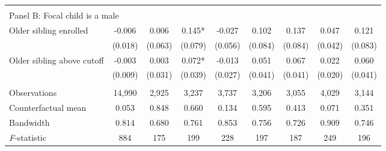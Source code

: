 {{\begin{tabular}{lcccccccc}
&  &  &  & & & & & \\
\multicolumn{10}{l}{Panel B: Focal child is a male} \\
Older sibling enrolled&      -0.006   &       0.006   &       0.145*  &      -0.027   &       0.102   &       0.137   &       0.047   &       0.121   \\
                    &     (0.018)   &     (0.063)   &     (0.079)   &     (0.056)   &     (0.084)   &     (0.084)   &     (0.042)   &     (0.083)   \\
 
Older sibling above cutoff&      -0.003   &       0.003   &       0.072*  &      -0.013   &       0.051   &       0.067   &       0.022   &       0.060   \\
                    &     (0.009)   &     (0.031)   &     (0.039)   &     (0.027)   &     (0.041)   &     (0.041)   &     (0.020)   &     (0.041)   \\
                    &               &               &               &               &               &               &               &               \\
Observations        &      14,990   &       2,925   &       3,237   &       3,737   &       3,206   &       3,055   &       4,029   &       3,144   \\
Counterfactual mean &       0.053   &       0.848   &       0.660   &       0.134   &       0.595   &       0.413   &       0.071   &       0.351   \\
Bandwidth           &       0.814   &       0.680   &       0.761   &       0.853   &       0.756   &       0.726   &       0.909   &       0.746   \\
\textit{F}-statistic&         884   &         175   &         199   &         228   &         197   &         187   &         249   &         196   \\
 

\bottomrule
\end{tabular}
}
}
